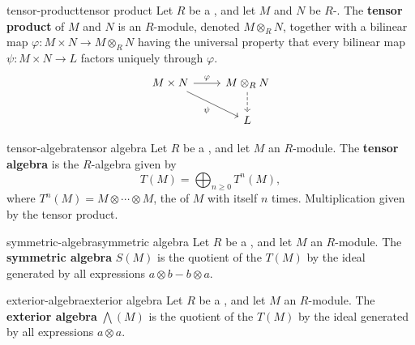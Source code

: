 \begin{topic}{tensor-product}{tensor product}
    Let $R$ be a , and let $M$ and $N$ be $R$-. The \textbf{tensor product} of $M$ and $N$ is an $R$-module, denoted $M \otimes_R N$, together with a bilinear map $\varphi : M \times N \to M \otimes_R N$ having the universal property that every bilinear map $\psi : M \times N \to L$ factors uniquely through $\varphi$.
    \[ \begin{tikzcd} M \times N \arrow{r}{\varphi} \arrow[swap]{dr}{\psi} & M \otimes_R N \arrow[dashed]{d} \\ & L \end{tikzcd} \]
\end{topic}

\begin{topic}{tensor-algebra}{tensor algebra}
    Let $R$ be a , and let $M$ an $R$-module. The \textbf{tensor algebra} is the $R$-algebra given by
    \[ T(M) = \bigoplus_{n \ge 0} T^n(M) , \]
    where $T^n(M) = M \otimes \cdots \otimes M$, the  of $M$ with itself $n$ times. Multiplication given by the tensor product.
\end{topic}

\begin{topic}{symmetric-algebra}{symmetric algebra}
    Let $R$ be a , and let $M$ an $R$-module. The \textbf{symmetric algebra} $S(M)$ is the quotient of the  $T(M)$ by the ideal generated by all expressions $a \otimes b - b \otimes a$.
\end{topic}

\begin{topic}{exterior-algebra}{exterior algebra}
    Let $R$ be a , and let $M$ an $R$-module. The \textbf{exterior algebra} $\bigwedge(M)$ is the quotient of the  $T(M)$ by the ideal generated by all expressions $a \otimes a$.
\end{topic}
